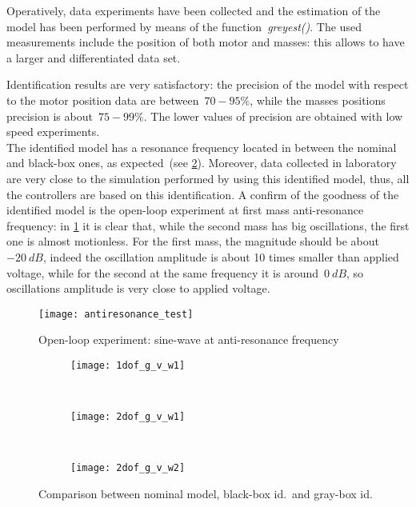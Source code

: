 Operatively, data experiments have been collected and the estimation of the model has been performed by means of the function~\textit{greyest()}. The used measurements include the position of both motor and masses: this allows to have a larger and differentiated data set.

Identification results are very satisfactory: the precision of the model with respect to the motor position data are between~$70 - 95\%$, while the masses positions precision is about~$75 - 99\%$. The lower values of precision are obtained with low speed experiments. \\

The identified model has a resonance frequency located in between the nominal and black-box ones, as expected~(see \cref{fig:allModels_comparison}). Moreover, data collected in laboratory are very close to the simulation performed by using this identified model, thus, all the controllers are based on this identification. A confirm of the goodness of the identified model is the open-loop experiment at first mass anti-resonance frequency: in \cref{fig:antiresonance} it is clear that, while the second mass has big oscillations, the first one is almost motionless. For the first mass, the magnitude should be about~$-20\ dB$, indeed the oscillation amplitude is about 10 times smaller than applied voltage, while for the second at the same frequency it is around~$0\ dB$, so oscillations amplitude is very close to applied voltage.
\begin{figure}[h]
	\centering
	\texttt{[image: antiresonance\_test]}
	\caption{Open-loop experiment: sine-wave at anti-resonance frequency}
	\label{fig:antiresonance}
\end{figure}

\begin{figure}[b]
	\centering
	\begin{subfigure}{\columnwidth}
		\centering
		\texttt{[image: 1dof\_g\_v\_w1]}
	\end{subfigure}
	\\
	\begin{subfigure}{\columnwidth}
		\centering
		\texttt{[image: 2dof\_g\_v\_w1]}
	\end{subfigure}
	\\
	\begin{subfigure}{\columnwidth}
		\centering
		\texttt{[image: 2dof\_g\_v\_w2]}
	\end{subfigure}
	\caption{Comparison between nominal model, black-box id.\ and gray-box id.}
	\label{fig:allModels_comparison}
\end{figure}
